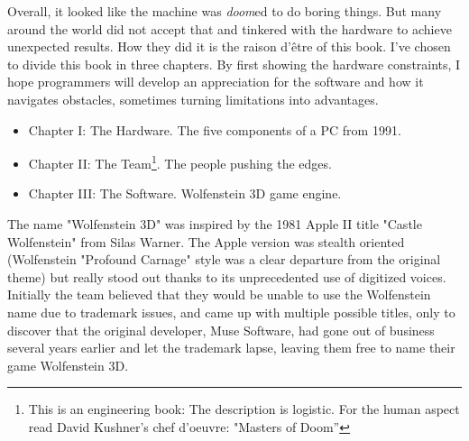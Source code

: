 Overall, it looked like the machine was \emph{doom}ed to do boring things. But many around the world did not accept that and tinkered with the hardware to achieve unexpected results. How they did it is the raison d'\^etre of this book. I've chosen to divide this book in three chapters. By first showing the hardware constraints, I hope programmers will develop an appreciation for the software and how it navigates obstacles, sometimes turning limitations into advantages.
\begin{itemize}
\item Chapter I: The Hardware. The five components of a PC from 1991.
\item Chapter II: The Team\footnote{This is an engineering book: The description is logistic. For the human aspect read David Kushner's chef d'oeuvre: "Masters of Doom''}. The people pushing the edges.
\item Chapter III: The Software. Wolfenstein 3D game engine.
\end{itemize}
\par
{} The name "Wolfenstein 3D" was inspired by the 1981 Apple II title "Castle Wolfenstein" from Silas Warner. The Apple version was stealth oriented (Wolfenstein "Profound Carnage" style was a clear departure from the original theme) but really stood out thanks to its unprecedented use of digitized voices. Initially the team believed that they would be unable to use the Wolfenstein name due to trademark issues, and came up with multiple possible titles, only to discover that the original developer, Muse Software, had gone out of business several years earlier and let the trademark lapse, leaving them free to name their game Wolfenstein 3D.

\begin{figure}[H]
\centering
{}
\end{figure}


\begin{figure}[H]
\centering
{}
\end{figure}

